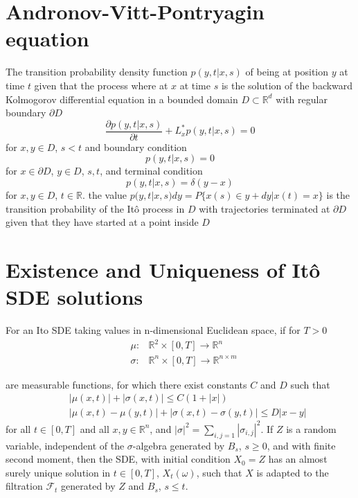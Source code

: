 \documentclass[12pt]{book}
\begin{document}
\section{Andronov-Vitt-Pontryagin equation}\label{section:AndronovVittPontryaginEquation}
The transition probability density function $p(y,t|x,s)$ of being at position $y$ at time $t$ given that the process where at $x$ at time $s$ is the solution of the backward Kolmogorov differential equation in a bounded domain $D\subset\mathbb{R}^d$ with regular boundary $\partial D$ 
\begin{equation*}
\frac{\partial p(y,t|x,s)}{\partial t}+L^*_xp(y,t|x,s) = 0
\end{equation*}
for $x,y\in D$, $s<t$ and boundary condition
\begin{equation*}
p(y,t|x,s)=0
\end{equation*}
for $x\in \partial D$, $y\in D$, $s,t$, and terminal condition
\begin{equation*}
p(y,t|x,s)=\delta(y-x)
\end{equation*}
for $x,y\in D$, $t\in \mathbb{R}$. the value $p(y,t|x,s)dy=P\{x(s)\in y+dy|x(t)=x\}$ is the transition probability of the It\^{o} process in $D$ with trajectories terminated at $\partial D$ given that they have started at a point inside $D$

\section{Existence and Uniqueness of It\^{o} SDE solutions}\label{section:existenceAndUniqueness}
For an Ito SDE taking values in n-dimensional Euclidean space, if for $T>0$\\
\begin{eqnarray*}
	&\mu:   &\mathbb{R}^2\times[0,T]\rightarrow \mathbb{R}^n\\
	&\sigma:&\mathbb{R}^n \times[0,T] \rightarrow \mathbb{R}^{n\times m}
\end{eqnarray*}

are measurable functions, for which there exist constants $C$ and $D$ such that 
\begin{eqnarray*}
	& &|\mu(x,t)|+|\sigma(x,t)|\leq C(1+|x|)\\
	& &|\mu(x,t)-\mu(y,t)|+|\sigma(x,t)-\sigma(y,t)|\leq D|x-y|
\end{eqnarray*}
for all $t\in [0,T]$ and all $x,y\in \mathbb{R}^n$, and $|\sigma|^2=\sum_{i,j=1}|\sigma_{i,j}|^2$. 
If $Z$ is a random variable, independent of the $\sigma$-algebra generated by $B_s$, $s\geq 0$, and with finite second moment, then the SDE, with initial condition $X_0=Z$ has an almost surely unique solution in $t\in[0,T]$, $X_t(\omega)$, such that $X$ is adapted to the filtration $\mathcal{F}_t$ generated by $Z$ and $B_s$, $s\leq t$.
\end{document}
